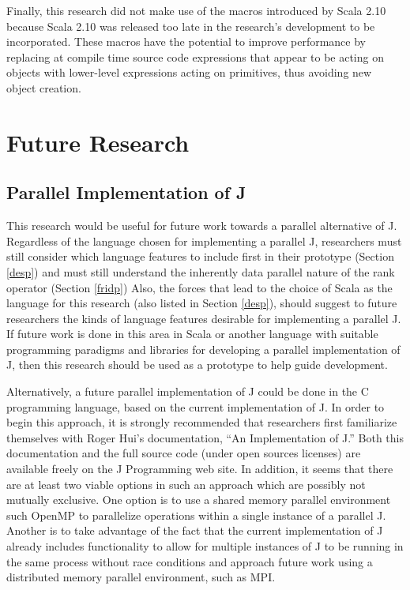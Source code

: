 Finally, this research did not make use of the macros introduced by Scala 2.10\cite{scala210} 
because Scala 2.10 was released too late in the research's development to be incorporated.
These macros have the potential to improve performance 
by replacing at compile time source code expressions that appear to be acting on objects 
with lower-level expressions acting on primitives, thus avoiding new object creation.

\section{Future Research}
\subsection{Parallel Implementation of J}
This research would be useful for future work towards a parallel alternative of J.
Regardless of the language chosen for implementing a parallel J, 
researchers must still consider which language features to include first in their prototype (Section \ref{desp})
and must still understand the inherently data parallel nature of the rank operator (Section \ref{fridp})
Also, the forces that lead to the choice of Scala as the language 
for this research (also listed in Section \ref{desp}), 
should suggest to future researchers the kinds of language features desirable 
for implementing a parallel J. 
If future work is done in this area in Scala 
or another language with suitable programming paradigms and libraries 
for developing a parallel implementation of J, 
then this research should be used as a prototype 
to help guide development.

Alternatively, a future parallel implementation of J
could be done in the C programming language, based on the current implementation of J\cite{ioj}. 
In order to begin this approach, 
it is strongly recommended that researchers first 
familiarize themselves with Roger Hui's documentation, ``An Implementation of J.''
Both this documentation and the full source code (under open sources licenses)
are available freely on the J Programming web site\cite{jweb}.
In addition, it seems that there are at least two viable options in such an approach 
which are possibly not mutually exclusive.
One option is to use a shared memory parallel environment such
OpenMP to parallelize operations within a single instance of a
parallel J. 
Another is to take advantage of the fact that the
current implementation of J already includes functionality to allow
for multiple instances of J to be running in the same process without
race conditions and approach future work using a distributed memory
parallel environment, such as MPI\cite{mpi}.

